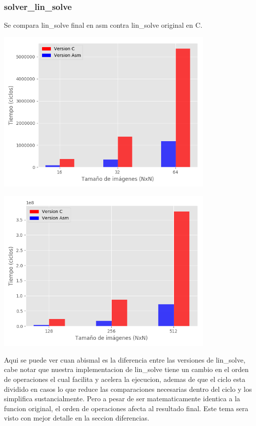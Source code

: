 \subsubsection{solver\_lin\_solve}
Se compara lin_solve final en asm contra lin_solve original en C.

\begin{center}
\includegraphics[width=0.8\textwidth]{imagenes/solver-lin-solve16-64.png}
\end{center}

\begin{center}
\includegraphics[width=0.8\textwidth]{imagenes/solver-lin-solve128-512.png}
\end{center}

Aqui se puede ver cuan abismal es la diferencia entre las versiones de lin_solve, cabe notar que nuestra
implementacion de lin_solve tiene un cambio en el orden de operaciones el cual facilita y acelera la ejecucion,
ademas de que el ciclo esta dividido en casos lo que reduce las comparaciones necesarias dentro del ciclo
y los simplifica sustancialmente.
Pero a pesar de ser matematicamente identica a la funcion original, el orden de operaciones afecta al
resultado final. Este tema sera visto con mejor detalle en la seccion diferencias.



